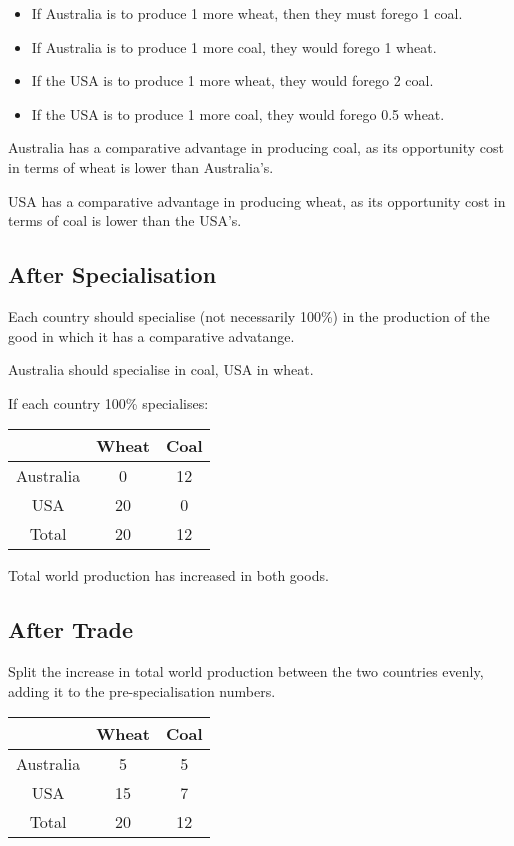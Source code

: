 \documentclass[a4paper,11pt]{article}
\begin{document}
\begin{itemize}
\item If Australia is to produce 1 more wheat, then they must forego 1 coal.
\item If Australia is to produce 1 more coal, they would forego 1 wheat.
\item If the USA is to produce 1 more wheat, they would forego 2 coal.
\item If the USA is to produce 1 more coal, they would forego 0.5 wheat.
\end{itemize}

Australia has a comparative advantage in producing coal, as its opportunity
cost in terms of wheat is lower than Australia's.

USA has a comparative advantage in producing wheat, as its opportunity cost in
terms of coal is lower than the USA's.


\subsection{After Specialisation}

Each country should specialise (not necessarily 100\%) in the production of the
good in which it has a comparative advatange.

Australia should specialise in coal, USA in wheat.

If each country 100\% specialises:

\begin{center}
\begin{tabular}{c|c|c}
& Wheat & Coal \\
\hline
Australia & 0  & 12 \\
USA       & 20 & 0  \\
Total     & 20 & 12 \\
\end{tabular}
\end{center}

Total world production has increased in both goods.


\subsection{After Trade}

Split the increase in total world production between the two countries evenly,
adding it to the pre-specialisation numbers.

\begin{center}
\begin{tabular}{c|c|c}
& Wheat & Coal \\
\hline
Australia & 5  & 5  \\
USA       & 15 & 7  \\
Total     & 20 & 12 \\
\end{tabular}
\end{center}
\end{document}
